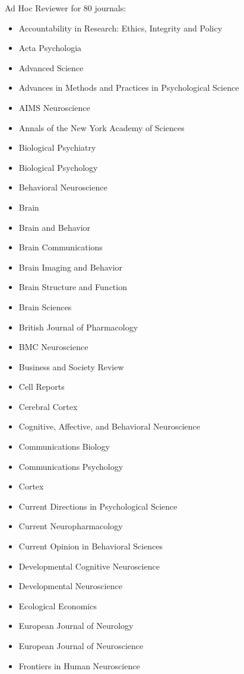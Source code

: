 \documentclass[11pt, letterpaper]{article}
\begin{document}
Ad Hoc Reviewer for 80 journals:
\begin{multicols}{2}
\begin{itemize}[noitemsep]
\itshape


\item Accountability in Research: Ethics, Integrity and Policy
\item Acta Psychologia
\item Advanced Science
\item Advances in Methods and Practices in Psychological Science
\item AIMS Neuroscience
\item Annals of the New York Academy of Sciences
\item Biological Psychiatry
\item Biological Psychology
\item Behavioral Neuroscience
\item Brain
\item Brain and Behavior
\item Brain Communications
\item Brain Imaging and Behavior
\item Brain Structure and Function
\item Brain Sciences
\item British Journal of Pharmacology
\item BMC Neuroscience 
\item Business and Society Review
\item Cell Reports
\item Cerebral Cortex 
\item Cognitive, Affective, and Behavioral Neuroscience 
\item Communications Biology
\item Communications Psychology
\item Cortex
\item Current Directions in Psychological Science
\item Current Neuropharmacology
\item Current Opinion in Behavioral Sciences
\item Developmental Cognitive Neuroscience 
\item Developmental Neuroscience 
\item Ecological Economics
\item European Journal of Neurology
\item European Journal of Neuroscience
\item Frontiers in Human Neuroscience 

\end{itemize}
\end{multicols}
\end{document}
